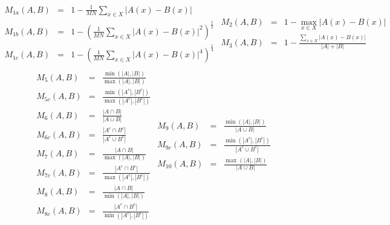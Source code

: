 \begin{table}[tp]
$$
\begin{array}{rcl}
\displaystyle M_{1a}(A,B) & = & \displaystyle 1-\frac{1}{M N}\sum_{x \in X} | A(x) - B(x) | \\
\displaystyle M_{1b}(A,B) & = & \displaystyle 1-\left(\frac{1}{M N}\sum_{x \in X} | A(x) - B(x) |^2\right)^\frac{1}{2} \\
\displaystyle M_{1c}(A,B) & = & \displaystyle 1-\left(\frac{1}{M N}\sum_{x \in X} | A(x) - B(x) |^4\right)^\frac{1}{4} \\
\end{array}
\begin{array}{rcl}
\displaystyle M_2(A,B) & = & \displaystyle 1 - \max_{x \in X} | A(x) - B(x) | \\[10pt]
\displaystyle M_3(A,B) & = & \displaystyle 1 - \frac{\displaystyle \sum_{x \in X} | A(x) - B(x) |}{\displaystyle |A| + |B|} \\
\end{array}
$$
$$
\begin{array}{rcl}
\displaystyle M_5(A,B) & = & \displaystyle \frac{\min (|A|,|B|)}{\max (|A|,|B|)} \\[10pt]
\displaystyle M_{5c}(A,B) & = & \displaystyle \frac{\min (|A^c|,|B^c|)}{\max (|A^c|,|B^c|)} \\[10pt]
\displaystyle M_6(A,B) & = & \displaystyle \frac{|A \cap B|}{|A \cup B|} \\[10pt]
\displaystyle M_{6c}(A,B) & = & \displaystyle \frac{|A^c \cap B^c|}{|A^c \cup B^c|} \\[10pt]
\displaystyle M_7(A,B) & = & \displaystyle \frac{|A \cap B|}{\max (|A|,|B|)} \\[10pt]
\displaystyle M_{7c}(A,B) & = & \displaystyle \frac{|A^c \cap B^c|}{\max (|A^c|,|B^c|)} \\[10pt]
\displaystyle M_8(A,B) & = & \displaystyle \frac{|A \cap B|}{\min (|A|,|B|)} \\[10pt]
\displaystyle M_{8c}(A,B) & = & \displaystyle \frac{|A^c \cap B^c|}{\min (|A^c|,|B^c|)} \\[10pt]
\end{array}
\begin{array}{rcl}
\displaystyle M_9(A,B) & = & \displaystyle \frac{\min (|A|,|B|)}{|A \cup B|} \\[10pt]
\displaystyle M_{9c}(A,B) & = & \displaystyle \frac{\min (|A^c|,|B^c|)}{|A^c \cup B^c|} \\[10pt]
\displaystyle M_{10}(A,B) & = & \displaystyle \frac{\max (|A|,|B|)}{|A \cup B|} \\[10pt]

\end{array}$$
\end{table}
